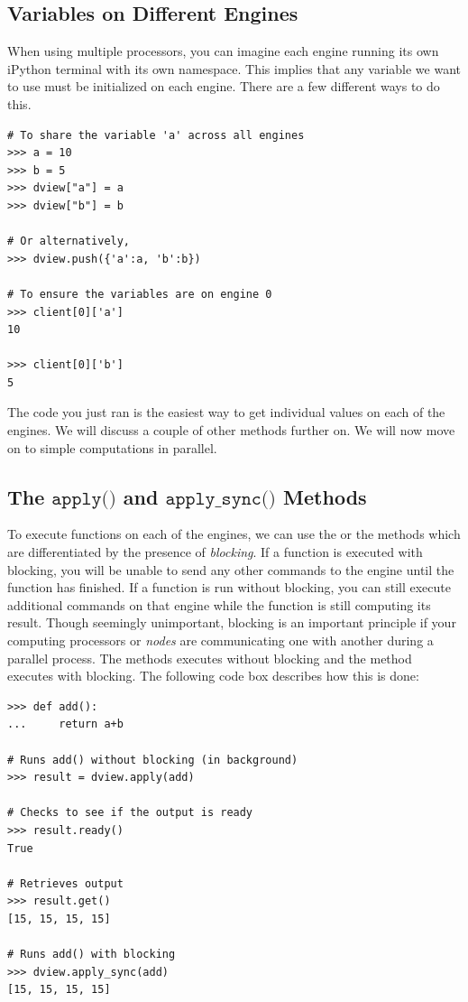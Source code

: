 \subsection*{Variables on Different Engines}
When using multiple processors, you can imagine each engine running its own iPython terminal with its own namespace.
This implies that any variable we want to use must be initialized on each engine. 
There are a few different ways to do this.

\begin{lstlisting}
# To share the variable 'a' across all engines
>>> a = 10
>>> b = 5
>>> dview["a"] = a
>>> dview["b"] = b

# Or alternatively,
>>> dview.push({'a':a, 'b':b})

# To ensure the variables are on engine 0
>>> client[0]['a']
10

>>> client[0]['b']
5
\end{lstlisting}

The code you just ran is the easiest way to get individual values on each of the engines.
We will discuss a couple of other methods further on.
We will now move on to simple computations in parallel.

\subsection*{The $\texttt{apply()}$ and $\texttt{apply\_sync()}$ Methods}
To execute functions on each of the engines, we can use the  or the  methods which are differentiated by the presence of \emph{blocking}.
If a function is executed with blocking, you will be unable to send any other commands to the engine until the function has finished.
If a function is run without blocking, you can still execute additional commands on that engine while the function is still computing its result.
Though seemingly unimportant, blocking is an important principle if your computing processors or \emph{nodes} are communicating one with another during a parallel process.
The  methods executes without blocking and the  method executes with blocking.
The following code box describes how this is done:

\begin{lstlisting}
>>> def add():
...     return a+b

# Runs add() without blocking (in background)
>>> result = dview.apply(add)

# Checks to see if the output is ready
>>> result.ready()
True

# Retrieves output
>>> result.get()
[15, 15, 15, 15]

# Runs add() with blocking
>>> dview.apply_sync(add)
[15, 15, 15, 15]
\end{lstlisting}

